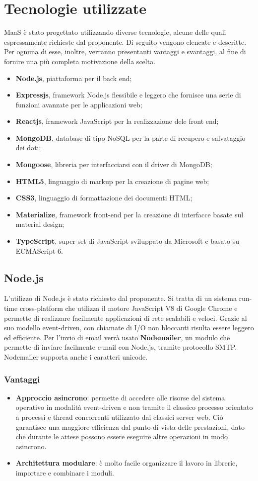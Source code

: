 \section{Tecnologie utilizzate}
MaaS \`e stato progettato utilizzando diverse tecnologie, alcune delle quali espressamente richieste dal proponente. Di seguito vengono elencate e descritte. Per ognuna di esse, inoltre, verranno presentanti vantaggi e svantaggi, al fine di fornire una pi\`u completa motivazione della scelta.
\begin{itemize}
\item \textbf{Node.js}, piattaforma per il back end;
\item \textbf{Expressjs}, framework Node.js flessibile e leggero che fornisce una serie di funzioni avanzate per le applicazioni web;
\item \textbf{Reactjs}, framework JavaScript per la realizzazione dele front end;
\item \textbf{MongoDB}, database di tipo NoSQL per la parte di recupero e salvataggio dei dati;
\item \textbf{Mongoose}, libreria per interfacciarsi con il driver di MongoDB;
\item \textbf{HTML5}, linguaggio di markup per la creazione di pagine web;
\item \textbf{CSS3}, linguaggio di formattazione dei documenti HTML;
\item \textbf{Materialize}, framework front-end per la creazione di interfacce basate sul material design;
\item \textbf{TypeScript}, super-set di JavaScript sviluppato da Microsoft e basato su ECMAScript 6.
\end{itemize}
\subsection{Node.js}
L'utilizzo di Node.js \`e stato richiesto dal proponente. Si tratta di un sistema run-time cross-platform che utilizza il motore JavaScript V8 di Google Chrome e permette di realizzare facilmente applicazioni di rete scalabili e veloci. Grazie al suo modello event-driven, con chiamate di I/O non bloccanti risulta essere leggero ed efficiente. Per l'invio di email verrà usato \textbf{Nodemailer}, un modulo che permette di inviare facilmente e-mail con Node.js, tramite protocollo SMTP. Nodemailer supporta anche i caratteri unicode.
\subsubsection{Vantaggi}
\begin{itemize}
\item \textbf{Approccio asincrono}: permette di accedere alle risorse del sistema operativo in modalit\`a event-driven e non tramite il classico processo orientato a processi e thread concorrenti utilizzato dai classici server web. Ci\`o garantisce una maggiore efficienza dal punto di vista delle prestazioni, dato che durante le attese possono essere eseguire altre operazioni in modo asincrono.
\item \textbf{Architettura modulare}: \`e molto facile organizzare il lavoro in librerie, importare e combinare i moduli.
\end{itemize}
